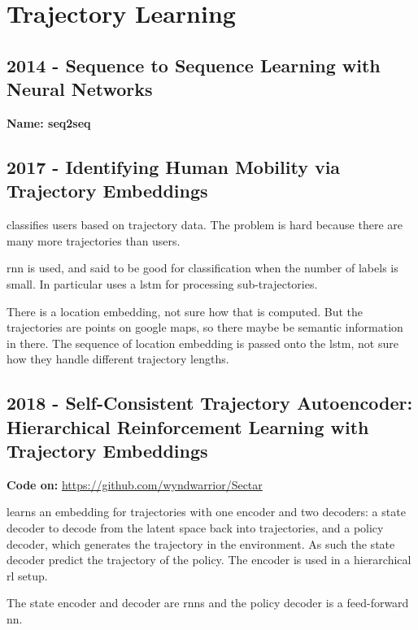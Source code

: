 \section{Trajectory Learning}\label{sec: traj learning}

\subsection*{2014 - Sequence to Sequence Learning with Neural Networks}

\textbf{Name: seq2seq}

\cite{sutskever2014sequence}

\subsection*{2017 - Identifying Human Mobility via Trajectory Embeddings}

\cite{gao2017identifying} classifies users based on trajectory data. The problem is hard because there are many more trajectories than users.

\gls{rnn} is used, and said to be good for classification when the number of labels is small. In particular uses a \gls{lstm} for processing sub-trajectories.

There is a location embedding, not sure how that is computed. But the trajectories are points on google maps, so there maybe be semantic information in there.
%
The sequence of location embedding is passed onto the \gls{lstm}, not sure how they handle different trajectory lengths.


\subsection*{2018 - Self-Consistent Trajectory Autoencoder: Hierarchical Reinforcement Learning with Trajectory Embeddings}

\textbf{Code on:} \url{https://github.com/wyndwarrior/Sectar}

\cite{co2018self} learns an embedding for trajectories with one encoder and two decoders: a state decoder to decode from the latent space back into trajectories, and a policy decoder, which generates the trajectory in the environment. As such the state decoder predict the trajectory of the policy. The encoder is used in a hierarchical \gls{rl} setup.

The state encoder and decoder are \glspl{rnn} and the policy decoder is a feed-forward \gls{nn}.

